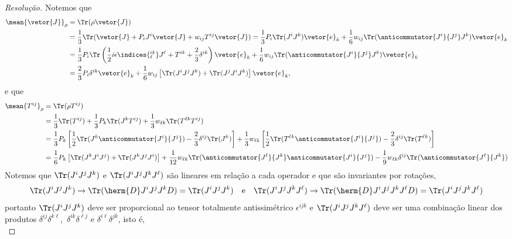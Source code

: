 \begin{proof}[Resolução]
    Notemos que
    \begin{align*}
        \mean{\vetor{J}}_\rho &= \Tr( \rho \vetor{J})\\
                              &= \frac13 \Tr(\vetor{J} + P_i J^i \vetor{J} + w_{ij} T^{ij} \vetor{J}) = \frac13 P_i \Tr(J^i J^k) \vetor{e}_k + \frac16 w_{ij} \Tr(\anticommutator{J^i}{J^j}J^k) \vetor{e}_k\\
                              &= \frac13 P_i \Tr\left(\frac12i\epsilon\indices{^{ik}_\ell}J^\ell + T^{ik} + \frac23 \delta^{ik}\right)\vetor{e}_k + \frac16 w_{ij} \Tr(\anticommutator{J^i}{J^j}J^k)\vetor{e}_k\\
                              &= \frac23 P_i \delta^{ik} \vetor{e}_k + \frac16 w_{ij} \left[\Tr(J^i J^j J^k) + \Tr(J^j J^i J^k)\right] \vetor{e}_k,
    \end{align*}
    e que
    \begin{align*}
        \mean{T^{ij}}_{\rho} &= \Tr(\rho T^{ij})\\
                             &= \frac13 \Tr(T^{ij}) + \frac13 P_k \Tr(J^k T^{ij}) + \frac13 w_{\ell k} \Tr(T^{\ell k} T^{ij})\\
                             &= \frac13 P_k \left[\frac12 \Tr(J^k \anticommutator{J^i}{J^j}) - \frac23 \delta^{ij} \Tr(J^k)\right] + \frac13 w_{\ell k} \left[\frac12\Tr(T^{\ell k} \anticommutator{J^i}{J^j}) - \frac23 \delta^{ij} \Tr(T^{\ell k})\right]\\
                             &= \frac16 P_k \left[\Tr(J^k J^i J^j) + \Tr(J^k J^j J^i)\right] + \frac1{12} w_{\ell k} \Tr(\anticommutator{J^\ell}{J^k} \anticommutator{J^i}{J^j}) - \frac19 w_{\ell k}\delta^{ij} \Tr(\anticommutator{J^\ell}{J^k})
    \end{align*}
    Notemos que \(\Tr(J^i J^j J^k)\) e \(\Tr(J^i J^j J^k J^\ell)\) são lineares em relação a cada operador e que são invariantes por rotações,
    \begin{equation*}
        \Tr(J^i J^j J^k) \to \Tr(\herm{D} J^i J^j J^k D) = \Tr(J^i J^j J^k)\quad\text{e}\quad
        \Tr(J^i J^j J^k J^\ell) \to \Tr(\herm{D} J^i J^j J^k J^\ell D) = \Tr(J^i J^j J^k J^\ell)
    \end{equation*}
    portanto \(\Tr(J^i J^j J^k)\) deve ser proporcional ao tensor totalmente antissimétrico \(\epsilon^{ijk}\) e \(\Tr(J^i J^j J^k J^\ell)\) deve ser uma combinação linear dos produtos \(\delta^{ij} \delta^{k \ell},\) \(\delta^{i k} \delta^{\ell j}\) e \(\delta^{i \ell} \delta^{jk}\), isto é,
    \begin{equation*}

\end{equation*}
\end{proof}
